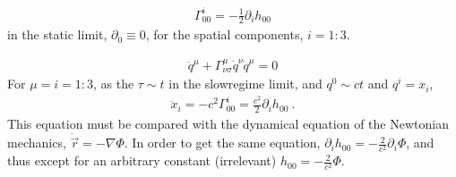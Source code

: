 \documentclass[letterpaper,10pt,english]{jupyterBook}
\begin{document}
\sphinxAtStartPar
{}
\begin{equation*}
\begin{split}\Gamma_{00}^{i} = - \frac{1}{2} \partial_i h_{00}\end{split}
\end{equation*}
\sphinxAtStartPar
in the static limit, \(\partial_0 \equiv 0\), for the spatial components, \(i = 1:3\).

\sphinxAtStartPar
{}
\begin{equation*}
\begin{split}\ddot{q}^{\mu} + \Gamma_{\nu \sigma}^{\mu} \dot{q}^{\nu} \dot{q}^{\mu} = 0\end{split}
\end{equation*}
\sphinxAtStartPar
For \(\mu = i = 1:3\), as the \(\tau \sim t\) in the slow\sphinxhyphen{}regime limit, and \(q^0 \sim c t\) and \(q^i = x_i\),
\begin{equation*}
\begin{split}\ddot{x}_i = - c^2 \Gamma_{00}^i = \frac{c^2}{2} \partial_i h_{00} \ .\end{split}
\end{equation*}
\sphinxAtStartPar
This equation must be compared with the dynamical equation of the Newtonian mechanics, \(\ddot{\vec{r}} = - \nabla \Phi\). In order to get the same equation, \(\partial_i h_{00} = - \frac{2}{c^2} \partial_i \Phi\), and thus \sphinxhyphen{} except for an arbitrary constant (irrelevant) \sphinxhyphen{} \(h_{00} = - \frac{2}{c^2} \Phi\).
\end{document}
